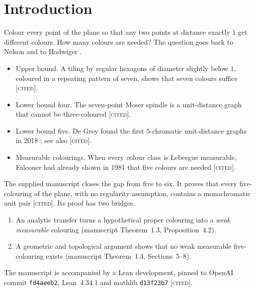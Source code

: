 \documentclass[11pt]{article}
\theoremstyle{definition}
\theoremstyle{remark}
\newcommand{\st}[1]{\textsc{[#1]}}
\begin{document}
\section{Introduction}
Colour every point of the plane so that any two points at distance exactly $1$ get different colours. How many colours are needed? The question goes back to Nelson and to Hadwiger \cite{Hadwiger}.

\begin{itemize}
\item Upper bound. A tiling by regular hexagons of diameter slightly below $1$, coloured in a repeating pattern of seven, shows that seven colours suffice \st{cited}.
\item Lower bound four. The seven-point Moser spindle is a unit-distance graph that cannot be three-coloured \cite{MoserMoser} \st{cited}.
\item Lower bound five. De Grey found the first $5$-chromatic unit-distance graphs in 2018 \cite{deGrey}; see also \cite{Heule,ExooIsmailescu,Parts} \st{cited}.
\item Measurable colourings. When every colour class is Lebesgue measurable, Falconer had already shown in 1981 that five colours are needed \cite{Falconer} \st{cited}.
\end{itemize}

The supplied manuscript \cite{OAI} closes the gap from five to six. It proves that every five-colouring of the plane, with no regularity assumption, contains a monochromatic unit pair \st{cited}. Its proof has two bridges.
\begin{enumerate}
\item An analytic transfer turns a hypothetical proper colouring into a \emph{weak measurable} colouring (manuscript Theorem~1.3, Proposition~4.2).
\item A geometric and topological argument shows that no weak measurable five-colouring exists (manuscript Theorem~1.4, Sections~5--8).
\end{enumerate}
The manuscript is accompanied by a Lean development, pinned to OpenAI commit \texttt{fd4aeeb2}, Lean~4.34.1 and mathlib \texttt{d13f23b7} \st{cited}.
\end{document}
